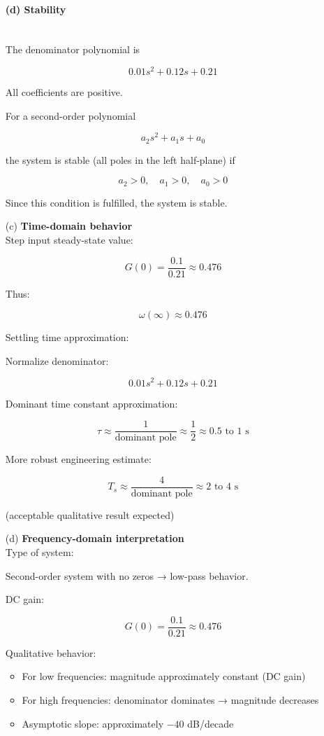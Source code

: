 \documentclass[a4paper,12pt]{article}
\begin{document}
\begin{enumerate}
\paragraph{(d) Stability}~\\

The denominator polynomial is

\[
0.01s^2+0.12s+0.21
\]

All coefficients are positive.

For a second-order polynomial

\[
a_2s^2+a_1s+a_0
\]

the system is stable (all poles in the left half-plane) if

\[
a_2>0,\quad a_1>0,\quad a_0>0
\]

Since this condition is fulfilled, the system is stable.

\item[(c)] \textbf{Time-domain behavior}~\\

Step input steady-state value:

\[
G(0)=\frac{0.1}{0.21}\approx 0.476
\]

Thus:

\[
\omega(\infty)\approx 0.476
\]

Settling time approximation:

Normalize denominator:

\[
0.01s^2+0.12s+0.21
\]

Dominant time constant approximation:

\[
\tau \approx \frac{1}{\text{dominant pole}} \approx \frac{1}{2} \approx 0.5 \text{ to } 1 \text{ s}
\]

More robust engineering estimate:

\[
T_s \approx \frac{4}{\text{dominant pole}} \approx 2 \text{ to } 4 \text{ s}
\]

(acceptable qualitative result expected)

\item[(d)] \textbf{Frequency-domain interpretation}~\\

Type of system:

Second-order system with no zeros → low-pass behavior.

DC gain:

\[
G(0)=\frac{0.1}{0.21}\approx 0.476
\]

Qualitative behavior:

\begin{itemize}
  \item For low frequencies: magnitude approximately constant (DC gain)
  \item For high frequencies: denominator dominates → magnitude decreases
  \item Asymptotic slope: approximately \(-40\) dB/decade
\end{itemize}


\end{enumerate}
\end{document}
